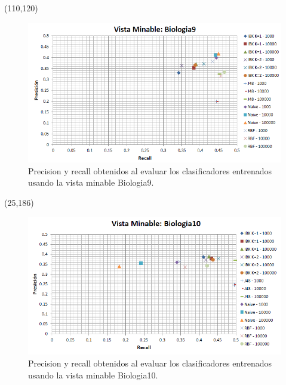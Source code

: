 \documentclass{article}
\begin{document}
\begin{textblock}{80}(110,120)
\begin{figure}[!htb]
\begin{centering}
\includegraphics[scale=0.4]{biologia9}
\par\end{centering}
\caption{Precision y recall obtenidos al evaluar los clasificadores entrenados usando la vista minable Biologia9.}
\label{fig:figura2}
\end{figure}
\end{textblock}

\begin{textblock}{80}(25,186)
\begin{figure}[!htb]
\begin{centering}
\includegraphics[scale=0.4]{biologia10}
\par\end{centering}
\caption{Precision y recall obtenidos al evaluar los clasificadores entrenados usando la vista minable Biologia10.}
\label{fig:figura3}
\end{figure}
\end{textblock}
\end{document}
